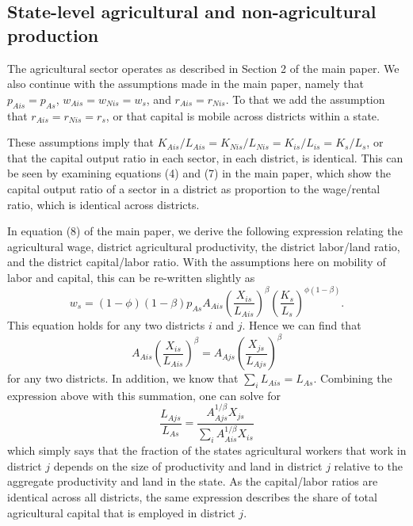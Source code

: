 \documentclass[11pt]{article}
\begin{document}
\subsection{State-level agricultural and non-agricultural production}
The agricultural sector operates as described in Section 2 of the main paper. We also continue with the assumptions made in the main paper, namely that $p_{Ais} = p_{As}$, $w_{Ais} = w_{Nis} = w_{s}$, and $r_{Ais} = r_{Nis}$. To that we add the assumption that $r_{Ais} = r_{Nis} = r_{s}$, or that capital is mobile across districts within a state. 

These assumptions imply that $K_{Ais}/L_{Ais} = K_{Nis}/L_{Nis} = K_{is}/L_{is} = K_s/L_s$, or that the capital output ratio in each sector, in each district, is identical. This can be seen by examining equations (4) and (7) in the main paper, which show the capital output ratio of a sector in a district as proportion to the wage/rental ratio, which is identical across districts.

In equation (8) of the main paper, we derive the following expression relating the agricultural wage, district agricultural productivity, the district labor/land ratio, and the district capital/labor ratio. With the assumptions here on mobility of labor and capital, this can be re-written slightly as
\begin{equation}
    w_{s} = (1-\phi)(1-\beta) p_{As} A_{Ais} \left(\frac{X_{is}}{L_{Ais}}\right)^{\beta} \left(\frac{K_{s}}{L_{s}}\right)^{\phi(1-\beta)}.
\end{equation}
This equation holds for any two districts $i$ and $j$. Hence we can find that
\begin{equation}
    A_{Ais} \left(\frac{X_{is}}{L_{Ais}}\right)^{\beta} = A_{Ajs} \left(\frac{X_{js}}{L_{Ajs}}\right)^{\beta}
\end{equation}
for any two districts. In addition, we know that $\sum_i L_{Ais} = L_{As}$. Combining the expression above with this summation, one can solve for
\begin{equation}
    \frac{L_{Ajs}}{L_{As}} = \frac{A_{Ajs}^{1/\beta} X_{js}}{\sum_i A_{Ais}^{1/\beta} X_{is}} \label{EQ_LaiLa}
\end{equation}
which simply says that the fraction of the states agricultural workers that work in district $j$ depends on the size of productivity and land in district $j$ relative to the aggregate productivity and land in the state. As the capital/labor ratios are identical across all districts, the same expression describes the share of total agricultural capital that is employed in district $j$.
\end{document}
